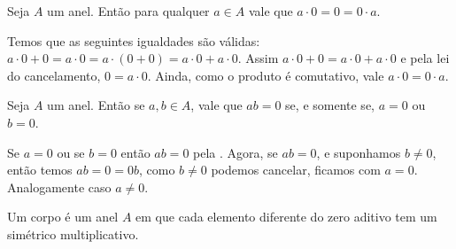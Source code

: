 \documentclass[../main.tex]{subfiles}
\begin{document}
\begin{prop}\label{agb-prop-anulamentoProdutoCom0}
    Seja $A$ um anel. Então para qualquer $a \in A$ vale que $a \cdot 0 = 0 = 0 \cdot a$.
\end{prop}
\begin{dem}
 Temos que as seguintes igualdades são válidas: $a \cdot 0+0 = a \cdot 0 = a \cdot (0+0) = a \cdot 0+a \cdot 0$. Assim $a \cdot 0+0 = a \cdot 0+a \cdot 0$ e pela lei do cancelamento, $0=a \cdot 0$. Ainda, como o produto é comutativo, vale $a \cdot 0=0 \cdot a$.
\end{dem}

\begin{prop}\label{agr-prop-anulamentoProduto}
    Seja $A$ um anel. Então se $a,b \in A$, vale que $ab = 0$ se, e somente se, $a = 0$ ou $b = 0$.
\end{prop}
\begin{dem}
    Se $a = 0$ ou se $b=0$ então $ab = 0$ pela .
    Agora, se $ab=0$, e suponhamos $b \neq 0$, então temos $ab = 0 = 0b$, como $b \neq 0$ podemos cancelar, ficamos com $a=0$. Analogamente caso $a \neq 0$.
\end{dem}

\begin{defi}\label{agb-def-corpo}
    Um corpo é um anel $A$ em que cada elemento diferente do zero aditivo tem um simétrico multiplicativo.
\end{defi}

\end{document}
